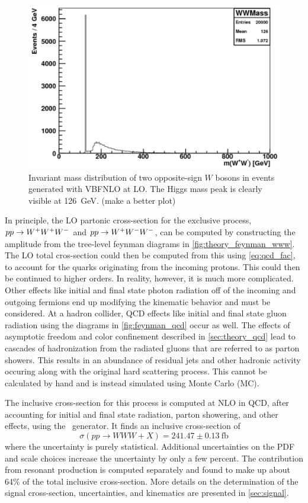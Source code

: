 \begin{figure}[ht]
\centering
\includegraphics[width=0.5\columnwidth]{figures/2l2j/mWW-parton.pdf}
\caption{ Invariant mass distribution of two opposite-sign $W$ bosons 
in \www events generated with VBFNLO at LO. The Higgs mass peak is clearly 
visible at 126~GeV. (make a better plot)}
\label{fig:mww_higgs}
\end{figure}



In principle, the LO partonic cross-section for the exclusive process, 
$pp\rightarrow\- W^{+}W^{+}W^{-}$ and $pp\rightarrow W^{+}W^{-}W^{-}$, 
can be computed by constructing the amplitude from the tree-level
feynman diagrams in \fig\ref{fig:theory_feynman_www}.  
The LO total cros-section could then be computed
from this using \eqn\eqref{eq:qcd_fac}, to account for the quarks 
originating from the incoming protons.
This could then be continued to higher orders. 
In reality, however, it is much more complicated. 
Other effects like initial and final state photon radiation off of the incoming
and outgoing fermions end up modifying the kinematic behavior and must
be considered. At a hadron collider, QCD effects like initial and 
final state gluon radiation using the diagrams in \fig\ref{fig:feynman_qcd}
occur as well. The effects of asymptotic freedom and color confinement
described in \sec\ref{sec:theory_qcd} 
lead to cascades of hadronization from the radiated
gluons that are referred to as parton showers. This results in an 
abundance of residual jets and other hadronic activity occuring along
with the original hard scattering process. 
This cannot be calculated by hand and is instead simulated
using Monte Carlo (MC).


The inclusive cross-section for this process is computed at 
NLO in QCD, after accounting for initial and 
final state radiation, parton showering, and other effects,
using the \madgraph~generator. It finds an inclusive cross-section of 
\begin{equation}
\sigma(pp\rightarrow WWW + X) = 241.47 \pm 0.13~\textrm{fb}
\label{eq:www_total_xsec}
\end{equation}
where the uncertainty is purely statistical.
Additional uncertainties
on the PDF and scale choices increase the uncertainty by only a few
percent.
The contribution from resonant production is computed separately
and found to make up about 64\% of the 
total inclusive cross-section.
More details on the determination of the signal cross-section, uncertainties,
and kinematics are presented in \sec\ref{sec:signal}.

